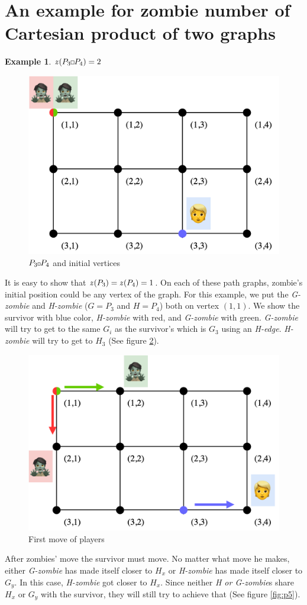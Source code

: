 \documentclass[1p]{elsarticle}
\newtheorem{example}[theorem]{Example}
\newcommand{\zn}{\ooalign{$z$\cr\hfil\rule[.5ex]{.2em}{.08ex}\hfil\cr}}
\newcommand{\sq}[1][black]{%
\begin{tikzpicture}                                                           
  \draw[#1] (2pt,0pt) -- (6pt,0pt);   
  \draw[#1] (2pt,0pt) -- (2pt,4pt);    
  \draw[#1] (2pt,4pt) -- (6pt,4pt);   
  \draw[#1] (6pt,0pt) -- (6pt,4pt);
\end{tikzpicture}%
}
\newcommand{\sqSmall}[1][black]{%
\begin{tikzpicture}                                                           
  \draw[#1] (1.5pt,0pt) -- (4.5pt,0pt);   
  \draw[#1] (1.5pt,0pt) -- (1.5pt,3pt);    
  \draw[#1] (1.5pt,3pt) -- (4.5pt,3pt);   
  \draw[#1] (4.5pt,0pt) -- (4.5pt,3pt);
\end{tikzpicture}%
}
\begin{document}
\section{An example for zombie number of Cartesian product of two graphs} \label{CartesianProductExample}
\begin{example} $\zn(P_3 \sq P_4 ) = 2$
\end{example}

\begin{figure}[h!]
	\centering
	\includegraphics[width=0.5\linewidth]{fig/p34m1.png}
	\caption{$P_3 \sqSmall P_4$ and initial vertices}
	\label{fig:p3}
\end{figure}

It is easy to show that $\zn(P_3) = \zn(P_4) = 1$. On each of these path graphs, zombie's initial position could be any
vertex of the graph. For this example, we put the {\it G-zombie} and {\it H-zombie} ($G = P_3$ and $H = P_4$) both on
vertex $(1,1)$. We show the survivor with blue color, {\it H-zombie} with red, and {\it G-zombie} with green. {\it
G-zombie} will try to get to the same $G_{i}$ as the survivor's which is $G_3$ using an {\it H-edge}. {\it H-zombie}
will try to get to $H_3$ (See figure \ref{fig:p4}).

\begin{figure}[h!]
	\centering
	\includegraphics[width=0.5\linewidth]{fig/p34m2.png}
	\caption{First move of players}
	\label{fig:p4}
\end{figure}

After zombies' move the survivor must move. No matter what move he makes, either {\it G-zombie} has made itself closer
to $H_x$ or {\it H-zombie} has made itself closer to $G_y$. In this case, {\it H-zombie} got closer to $H_x$. Since
neither {\it H or G-zombie}s share $H_x$ or $G_y$ with the survivor, they will still try to achieve that (See figure \ref{fig:p5}).
\end{document}
